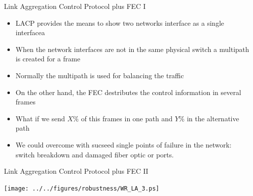 \documentclass[compress,red]{beamer}
\begin{document}
\begin{frame}{Link Aggregation Control Protocol plus FEC I}

\begin{itemize}
    \item LACP provides the means to show two networks interface as a single  interfacea
    \item When the network interfaces are not in the same physical switch a  multipath is created for a frame
    \item Normally the multipath is used for balancing the traffic
    \item On the other hand, the FEC destributes the control information in several frames
    \item What if we send $X\%$ of this frames in one path and $Y\%$ in the alternative path
    \item We could overcome with sucseed single points of failure in the network: switch breakdown and damaged fiber optic or ports.
\end{itemize}
\end{frame}

\begin{frame}{Link Aggregation Control Protocol plus FEC II}

      \begin{center}
	        \texttt{[image: ../../figures/robustness/WR\_LA\_3.ps]}
      \end{center}
\end{frame}
\end{document}
